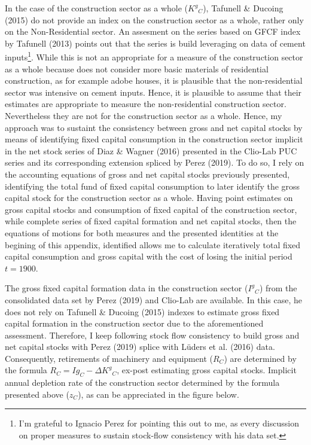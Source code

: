 In the case of the construction sector as a whole (${K^{g}}_{C}$), Tafunell \& Ducoing (2015) do not provide an index on the construction sector as a whole, rather only on the Non-Residential sector. An assesment on the series based on GFCF index by Tafunell (2013) points out that the series is build leveraging on data of cement inputs\footnote{I'm grateful to Ignacio Perez for pointing this out to me, as every discussion on proper measures to sustain stock-flow consistency with his data set.}. While this is not an appropriate for a measure of the construction sector as a whole because does not consider more basic materials of residential construction, as for example adobe houses, it is plausible  that the non-residential sector was intensive on cement inputs. Hence, it is plausible to assume that their estimates are appropriate to measure the non-residential construction sector.  Nevertheless they are not for the construction sector as a whole. Hence, my approach was to sustaint the consistency between gross and net capital stocks by means of identifying fixed capital consumption in the construction sector implicit in the net stock series of Diaz \& Wagner (2016) presented in the Clio-Lab PUC series and its corresponding extension spliced by Perez (2019). To do so, I rely on the accounting equations of gross and net capital stocks previously presented, identifying the total fund of fixed capital consumption to later identify the gross capital stock for the construction sector as a whole. Having point estimates on gross capital stocks and consumption of fixed capital of the construction sector, while complete series of fixed capital formation and net capital stocks, then the equations of motions for both measures and the presented identities at the begining of this appendix, identified allows me to calculate iteratively total fixed capital consumption and gross capital with the cost of losing the initial period $t=1900$.
	
The gross fixed capital formation data in the construction sector (${I^{g}}_{C}$) from the consolidated data set by Perez (2019) and Clio-Lab are available. In this case, he does not rely on Tafunell \& Ducoing (2015) indexes to estimate gross fixed capital formation in the construction sector due to the aforementioned assessment. Therefore, I keep following stock flow consistency to build gross and net capital stocks with Perez (2019) splice with Lüders et al. (2016) data. Consequently, retirements of machinery and equipment ($R_{C}$) are determined by the formula $R_{C} = Ig_{C} - \Delta {K^{g}}_{C}$, ex-post estimating gross capital stocks. Implicit annual depletion rate of the construction sector determined by the formula presented above ($z_{C}$), as can be appreciated in the figure below. 

